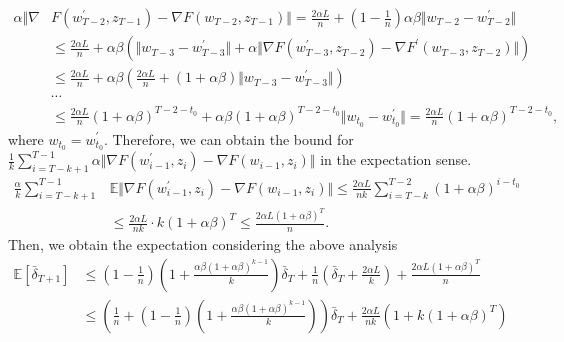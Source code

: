  \begin{equation}\label{noncon-sigbound}
  \begin{aligned}    
    \alpha\Vert\nabla &F(w^{\prime}_{T-2},z_{T-1}) - \nabla F(w_{T-2},z_{T-1}) \Vert = \frac{2\alpha L}{n} + \left(1-\frac{1}{n}\right)\alpha\beta\Vert w_{T-2} - w^{\prime}_{T-2} \Vert\\
    &\leq \frac{2\alpha L}{n} + \alpha\beta\left(\Vert w_{T-3} - w^{\prime}_{T-3} \Vert + \alpha \Vert \nabla F(w^{\prime}_{T-3},z_{T-2})-\nabla F^{\prime}(w_{T-3},z_{T-2}) \Vert\right) \\
    &\leq \frac{2\alpha L}{n} + \alpha\beta\left(\frac{2\alpha L}{n} + (1+\alpha\beta)\Vert w_{T-3} - w^{\prime}_{T-3} \Vert\right) \\
    &\cdots\\
    &\leq \frac{2\alpha L}{n}(1+\alpha\beta)^{T-2-t_0} + \alpha\beta(1+\alpha\beta)^{T-2-t_0}\Vert w_{t_{0}} - w^{\prime}_{t_{0}} \Vert =\frac{2\alpha L}{n}(1+\alpha\beta)^{T-2-t_0},
  \end{aligned}
 \end{equation}
where $w_{t_{0}} = w^{\prime}_{t_{0}}$. Therefore, we can obtain the bound for $\frac{1}{k}\sum_{i=T-k+1}^{T-1} \alpha \Vert\nabla F(w^{\prime}_{i-1},z_i) - \nabla F(w_{i-1},z_i) \Vert$ in the expectation sense.
\begin{equation}\label{44}
    \begin{aligned}
     \frac{\alpha}{k}\sum_{i=T-k+1}^{T-1} & \mathbb{E} \Vert\nabla F(w^{\prime}_{i-1},z_i) - \nabla F(w_{i-1},z_i) \Vert 
     \leq \frac{2\alpha L}{nk} \sum_{i=T-k}^{T-2} (1+\alpha\beta)^{i-t_{0}} \\
     &\leq \frac{2\alpha L}{nk} \cdot k (1+\alpha\beta)^{T} \leq \frac{2\alpha L(1+\alpha\beta)^{T}}{n}.  
    \end{aligned}
\end{equation}
Then, we obtain the expectation considering the above analysis 
 \begin{equation}
    \begin{aligned}
     \mathbb{E}\left[\bar{\delta}_{T+1}\right] &\leq (1-\frac{1}{n})\left(1+\frac{\alpha \beta(1+\alpha \beta)^{k-1}}{k}\right)\bar{\delta}_T + \frac{1}{n}\left(\bar{\delta}_T+\frac{2\alpha L}{k}\right) + \frac{2\alpha L(1+\alpha\beta)^{T}}{n}\\ 
     &\leq \left(\frac{1}{n}+(1-\frac{1}{n})\left(1+\frac{\alpha \beta(1+\alpha \beta)^{k-1}}{k}\right)\right)\bar{\delta}_{T} + \frac{2\alpha L}{nk}\left(1+k(1+\alpha\beta)^{T}\right)\\
    \end{aligned}
   \end{equation}

